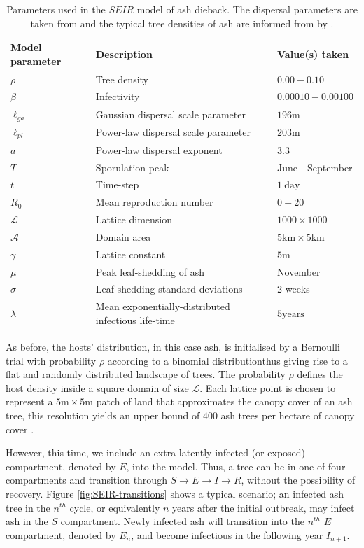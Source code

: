 \begin{table}[h]
\centering
\begin{tabular}{l l l}
\hline
\textbf{Model parameter} & \textbf{Description} & \textbf{Value(s) taken}\\
\hline
$\rho$  & Tree density & $0.00 - 0.10$ \\ 
$\beta$ & Infectivity & $0.00010 - 0.00100$ \\
$\ell_{ga}$ & Gaussian dispersal scale parameter& $196\mathrm{m}$ \\
$\ell_{pl}$ & Power-law dispersal scale parameter& $203\mathrm{m}$ \\
$a$ & Power-law dispersal exponent & $3.3$ \\
$T$ & Sporulation peak & June - September \\
$t$ & Time-step & $1\ \mathrm{day}$\\
$R_0$ & Mean reproduction number & $0-20$ \\
$\mathcal{L}$ & Lattice dimension & $1000\times1000$ \\
$\mathcal{A}$ & Domain area & $5\mathrm{km}\times5\mathrm{km}$ \\
$\gamma$ & Lattice constant & $5\mathrm{m}$ \\
$\mu$ & Peak leaf-shedding of ash & November \\
$\sigma$ & Leaf-shedding standard deviations & 2 weeks \\
$\lambda$ & Mean exponentially-distributed infectious life-time  & $5 \mathrm{years}$ \\
\hline
\end{tabular}
\caption{Parameters used in the $SEIR$ model of ash dieback. The dispersal parameters are taken from \cite{grosdidier2018tracking} and the typical tree densities of ash are informed from by \cite{hill.data}.}
\label{tab:SEIR-model}
\end{table}

As before, the hosts' distribution, in this case ash, is initialised by a Bernoulli trial with probability $\rho$ according to a binomial distribution\textemdash thus giving rise to a flat and randomly distributed landscape of trees. The probability $\rho$ defines the host density inside a square domain of size $\mathcal{L}$. Each lattice point is chosen to represent a $5\mathrm{m}\times5\mathrm{m}$ patch of land that approximates the canopy cover of an ash tree, this resolution yields an upper bound of $400$ ash trees per hectare of canopy cover \cite{ash-tree2, ash-tree1}.

However, this time, we include an extra latently infected (or exposed) compartment, denoted by $E$, into the model. Thus, a tree can be in one of four compartments and transition through $S\rightarrow E \rightarrow I \rightarrow R$, without the possibility of recovery. Figure \ref{fig:SEIR-transitions} shows a typical scenario; an infected ash tree in the $n^{th}$ cycle, or equivalently $n$ years after the initial outbreak, may infect ash in the $S$ compartment. Newly infected ash will transition into the $n^{th}$ $E$ compartment, denoted by $E_n$, and become infectious in the following year $I_{n+1}$. 

